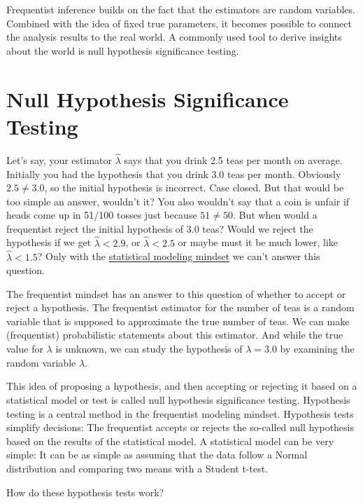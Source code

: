 \documentclass[
  10pt,
]{scrbook}
\begin{document}
Frequentist inference builds on the fact that the estimators are random variables.
Combined with the idea of fixed true parameters, it becomes possible to connect the analysis results to the real world.
A commonly used tool to derive insights about the world is null hypothesis significance testing.

\hypertarget{null-hypothesis-significance-testing}{%
\section{Null Hypothesis Significance Testing}\label{null-hypothesis-significance-testing}}

Let's say, your estimator \(\hat{\lambda}\) says that you drink 2.5 teas per month on average.
Initially you had the hypothesis that you drink 3.0 teas per month.
Obviously \(2.5 \neq 3.0\), so the initial hypothesis is incorrect.
Case closed.
But that would be too simple an answer, wouldn't it?
You also wouldn't say that a coin is unfair if heads come up in 51/100 tosses just because \(51 \neq 50\).
But when would a frequentist reject the initial hypothesis of 3.0 teas?
Would we reject the hypothesis if we get \(\hat{\lambda}<2.9\), or \(\hat{\lambda}<2.5\) or maybe must it be much lower, like \(\hat{\lambda}<1.5\)?
Only with the \protect\hyperlink{statistical-modeling}{statistical modeling mindset} we can't answer this question.

The frequentist mindset has an answer to this question of whether to accept or reject a hypothesis.
The frequentist estimator for the number of teas is a random variable that is supposed to approximate the true number of teas.
We can make (frequentist) probabilistic statements about this estimator.
And while the true value for \(\lambda\) is unknown, we can study the hypothesis of \(\lambda = 3.0\) by examining the random variable \(\hat{\lambda}\).

This idea of proposing a hypothesis, and then accepting or rejecting it based on a statistical model or test is called null hypothesis significance testing.
Hypothesis testing is a central method in the frequentist modeling mindset.
Hypothesis tests simplify decisions:
The frequentist accepts or rejects the so-called null hypothesis based on the results of the statistical model.
A statistical model can be very simple:
It can be as simple as assuming that the data follow a Normal distribution and comparing two means with a Student t-test.

How do these hypothesis tests work?
\end{document}
